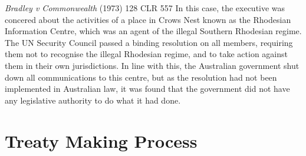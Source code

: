 \begin{casedetails}{\textit{Bradley v Commonwealth} (1973) 128 CLR 557}
    \flushleft
    In this case, the executive was concered about the activities of a place in Crows Nest known as the Rhodesian Information Centre, which was an agent of the illegal Southern Rhodesian regime. The UN Security Council passed a binding resolution on all members, requiring them not to recognise the illegal Rhodesian regime, and to take action against them in their own jurisdictions. In line with this, the Australian government shut down all communications to this centre, but as the resolution had not been implemented in Australian law, it was found that the government did not have any legislative authority to do what it had done.
\end{casedetails}

\section{Treaty Making Process}

